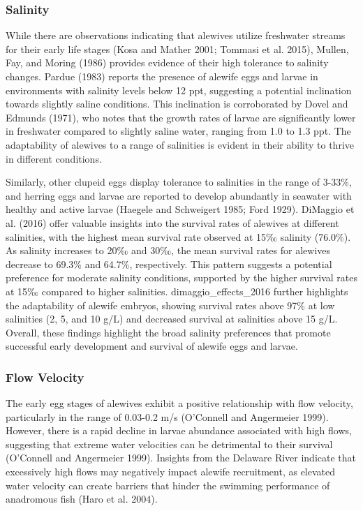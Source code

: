 \documentclass[
]{book}
\begin{document}
\hypertarget{salinity-2}{%
\subsubsection{Salinity}\label{salinity-2}}

While there are observations indicating that alewives utilize freshwater streams for their early life stages (Kosa and Mather 2001; Tommasi et al. 2015), Mullen, Fay, and Moring (1986) provides evidence of their high tolerance to salinity changes. Pardue (1983) reports the presence of alewife eggs and larvae in environments with salinity levels below 12 ppt, suggesting a potential inclination towards slightly saline conditions. This inclination is corroborated by Dovel and Edmunds (1971), who notes that the growth rates of larvae are significantly lower in freshwater compared to slightly saline water, ranging from 1.0 to 1.3 ppt. The adaptability of alewives to a range of salinities is evident in their ability to thrive in different conditions.

Similarly, other clupeid eggs display tolerance to salinities in the range of 3-33\%, and herring eggs and larvae are reported to develop abundantly in seawater with healthy and active larvae (Haegele and Schweigert 1985; Ford 1929). DiMaggio et al. (2016) offer valuable insights into the survival rates of alewives at different salinities, with the highest mean survival rate observed at 15‰ salinity (76.0\%). As salinity increases to 20‰ and 30‰, the mean survival rates for alewives decrease to 69.3\% and 64.7\%, respectively. This pattern suggests a potential preference for moderate salinity conditions, supported by the higher survival rates at 15‰ compared to higher salinities. dimaggio\_effects\_2016 further highlights the adaptability of alewife embryos, showing survival rates above 97\% at low salinities (2, 5, and 10 g/L) and decreased survival at salinities above 15 g/L. Overall, these findings highlight the broad salinity preferences that promote successful early development and survival of alewife eggs and larvae.

\hypertarget{flow-velocity-2}{%
\subsubsection{Flow Velocity}\label{flow-velocity-2}}

The early egg stages of alewives exhibit a positive relationship with flow velocity, particularly in the range of 0.03-0.2 m/s (O'Connell and Angermeier 1999). However, there is a rapid decline in larvae abundance associated with high flows, suggesting that extreme water velocities can be detrimental to their survival (O'Connell and Angermeier 1999). Insights from the Delaware River indicate that excessively high flows may negatively impact alewife recruitment, as elevated water velocity can create barriers that hinder the swimming performance of anadromous fish (Haro et al. 2004).
\end{document}
